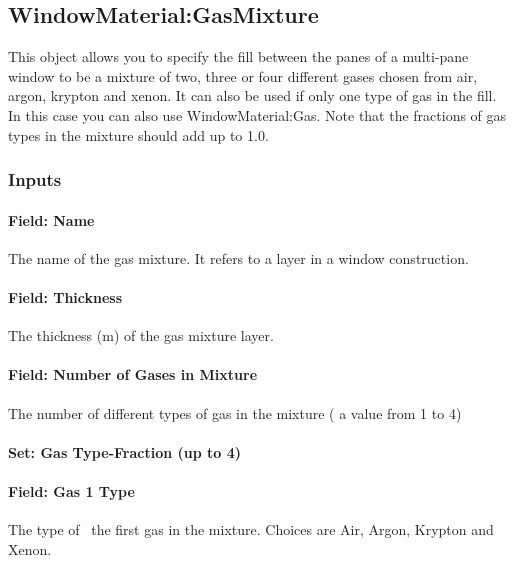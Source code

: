 \subsection{WindowMaterial:GasMixture}\label{windowmaterialgasmixture}

This object allows you to specify the fill between the panes of a multi-pane window to be a mixture of two, three or four different gases chosen from air, argon, krypton and xenon. It can also be used if only one type of gas in the fill. In this case you can also use WindowMaterial:Gas. Note that the fractions of gas types in the mixture should add up to 1.0.

\subsubsection{Inputs}\label{inputs-17-009}

\paragraph{Field: Name}\label{field-name-11-014}

The name of the gas mixture. It refers to a layer in a window construction.

\paragraph{Field: Thickness}\label{field-thickness-4}

The thickness (m) of the gas mixture layer.

\paragraph{Field: Number of Gases in Mixture}\label{field-number-of-gases-in-mixture}

The number of different types of gas in the mixture ( a value from 1 to 4)

\paragraph{Set: Gas Type-Fraction (up to 4)}\label{set-gas-type-fraction-up-to-4}

\paragraph{Field: Gas 1 Type}\label{field-gas-1-type}

The type of~ the first gas in the mixture. Choices are Air, Argon, Krypton and Xenon.

